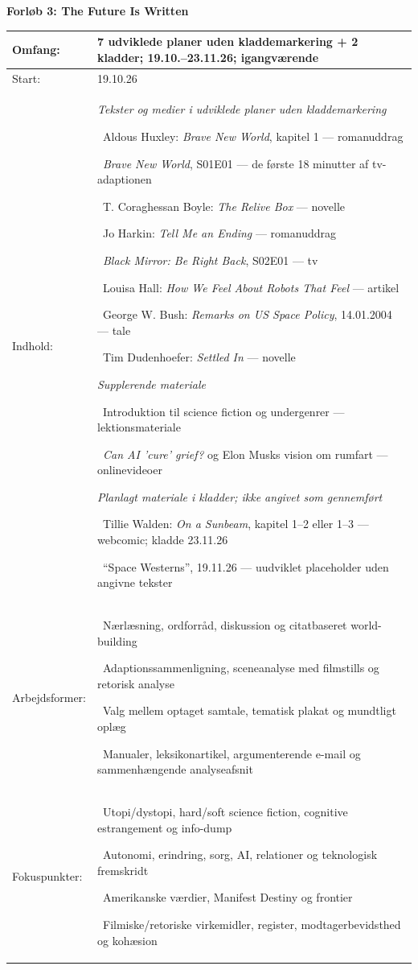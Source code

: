 \documentclass[10pt,a4paper]{article}
\newcommand{\ubheading}[1]{{\large\bfseries\overp\color{frbgreen}#1\par}}
\newcommand{\ubitem}[1]{\textbullet\ #1\par}
\newcommand{\ubgroup}[1]{\textit{#1}\par}
\newcommand{\ubgap}{\vspace{0.5em}}
\newcommand{\unittable}[6]{%
  \vspace{1em}%
  \ubheading{#1}%
  \vspace{0.4em}%
  \begin{tabularx}{\linewidth}{|l|X|}
    \hline
    Omfang: & #3 \\\hline
    Start: & #2 \\\hline
    Indhold: & {\setlength{\parskip}{0pt}#4} \\\hline
    Arbejdsformer: & {\setlength{\parskip}{0pt}#5} \\\hline
    Fokuspunkter: & {\setlength{\parskip}{0pt}#6} \\\hline
  \end{tabularx}%
}
\begin{document}
\unittable{Forløb 3: The Future Is Written}{19.10.26}{7 udviklede planer uden kladdemarkering + 2 kladder; 19.10.--23.11.26; igangværende}{%
  \ubgroup{Tekster og medier i udviklede planer uden kladdemarkering}
  \ubitem{Aldous Huxley: \textit{Brave New World}, kapitel 1 --- romanuddrag}
  \ubitem{\textit{Brave New World}, S01E01 --- de første 18 minutter af tv-adaptionen}
  \ubitem{T. Coraghessan Boyle: \textit{The Relive Box} --- novelle}
  \ubitem{Jo Harkin: \textit{Tell Me an Ending} --- romanuddrag}
  \ubitem{\textit{Black Mirror: Be Right Back}, S02E01 --- tv}
  \ubitem{Louisa Hall: \textit{How We Feel About Robots That Feel} --- artikel}
  \ubitem{George W. Bush: \textit{Remarks on US Space Policy}, 14.01.2004 --- tale}
  \ubitem{Tim Dudenhoefer: \textit{Settled In} --- novelle}
  \ubgap\ubgroup{Supplerende materiale}
  \ubitem{Introduktion til science fiction og undergenrer --- lektionsmateriale}
  \ubitem{\textit{Can AI 'cure' grief?} og Elon Musks vision om rumfart --- onlinevideoer}
  \ubgap\ubgroup{Planlagt materiale i kladder; ikke angivet som gennemført}
  \ubitem{Tillie Walden: \textit{On a Sunbeam}, kapitel 1--2 eller 1--3 --- webcomic; kladde 23.11.26}
  \ubitem{``Space Westerns'', 19.11.26 --- uudviklet placeholder uden angivne tekster}
}{%
  \ubitem{Nærlæsning, ordforråd, diskussion og citatbaseret world-building}
  \ubitem{Adaptionssammenligning, sceneanalyse med filmstills og retorisk analyse}
  \ubitem{Valg mellem optaget samtale, tematisk plakat og mundtligt oplæg}
  \ubitem{Manualer, leksikonartikel, argumenterende e-mail og sammenhængende analyseafsnit}
}{%
  \ubitem{Utopi/dystopi, hard/soft science fiction, cognitive estrangement og info-dump}
  \ubitem{Autonomi, erindring, sorg, AI, relationer og teknologisk fremskridt}
  \ubitem{Amerikanske værdier, Manifest Destiny og frontier}
  \ubitem{Filmiske/retoriske virkemidler, register, modtagerbevidsthed og kohæsion}
}
\end{document}
